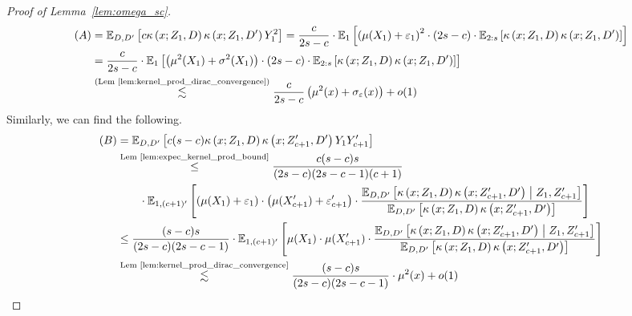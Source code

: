 \begin{proof}[Proof of Lemma~\ref{lem:omega_sc}]
\begin{equation}
		\begin{aligned}
            (A) & = 
			\mathbb{E}_{D, D^{\prime}}\left[c\kappa\left(x; Z_{1}, D\right)\kappa\left(x; Z_{1}, D^{\prime}\right)Y_{1}^{2}\right]
			= \frac{c}{2s-c} \cdot \mathbb{E}_{1}\left[\left(\mu(X_1) + \varepsilon_1\right)^2 \cdot (2s-c) \cdot \mathbb{E}_{2:s}\left[\kappa\left(x; Z_{1}, D\right)\kappa\left(x; Z_{1}, D^{\prime}\right)\right]\right] \\
            & = \frac{c}{2s-c} \cdot \mathbb{E}_{1}\left[\left(\mu^{2}(X_1) + \sigma^{2}(X_1)\right) \cdot (2s-c) \cdot \mathbb{E}_{2:s}\left[\kappa\left(x; Z_{1}, D\right)\kappa\left(x; Z_{1}, D^{\prime}\right)\right]\right]\\
		      & \overset{\text{(Lem~\ref{lem:kernel_prod_dirac_convergence})}}{\lesssim} \frac{c}{2s-c} \left(\mu^2(x) + \sigma_{\varepsilon}(x)\right) + o(1)
		\end{aligned}
	\end{equation}
	Similarly, we can find the following.
	\begin{equation}
		\begin{aligned}
            (B) & = \E_{D, D^{\prime}}\left[c(s-c) \kappa\left(x; Z_{1}, D\right)\kappa\left(x; Z_{c+1}^{\prime}, D^{\prime}\right)Y_{1}Y_{c+1}^{\prime}\right] \\
            & \overset{\text{Lem \ref{lem:expec_kernel_prod_bound}}}{\leq} \frac{c(s-c)s}{(2s - c)(2s-c-1)(c+1)} \\
            & \quad \quad \cdot
            \E_{1, (c+1)^{\prime}}\left[
                \left(\mu(X_1) + \varepsilon_{1}\right)\cdot\left(\mu(X_{c+1}^{\prime}) + \varepsilon_{c+1}^{\prime}\right) \cdot \frac{\E_{D, D^{\prime}}\left[\kappa\left(x; Z_{1}, D\right)\kappa\left(x; Z_{c+1}^{\prime}, D^{\prime}\right) \; \middle| \; Z_{1}, Z_{c+1}^{\prime}\right]}{\E_{D, D^{\prime}}\left[\kappa\left(x; Z_{1}, D\right)\kappa\left(x; Z_{c+1}^{\prime}, D^{\prime}\right)\right]}
            \right]\\
            & \leq \frac{(s-c)s}{(2s - c)(2s-c-1)} \cdot
            \E_{1, (c+1)^{\prime}}\left[
                \mu(X_1) \cdot \mu(X_{c+1}^{\prime}) \cdot \frac{\E_{D, D^{\prime}}\left[\kappa\left(x; Z_{1}, D\right)\kappa\left(x; Z_{c+1}^{\prime}, D^{\prime}\right) \; \middle| \; Z_{1}, Z_{c+1}^{\prime}\right]}{\E_{D, D^{\prime}}\left[\kappa\left(x; Z_{1}, D\right)\kappa\left(x; Z_{c+1}^{\prime}, D^{\prime}\right)\right]}
            \right]\\
			& \overset{\text{Lem \ref{lem:kernel_prod_dirac_convergence}}}{\lesssim}  \frac{(s-c)s}{(2s - c)(2s-c-1)} \cdot \mu^2(x) + o(1)

\end{aligned}
\end{equation}
\end{proof}
